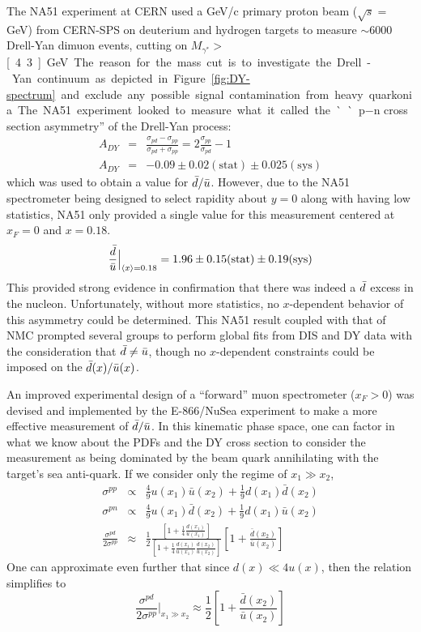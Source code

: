 The NA51 experiment at CERN\cite{Baldit:1994jk} used a \unit[450]{GeV/c} primary proton beam ($\sqrt{s}=$\unit[29]{GeV}) from CERN-SPS on deuterium and hydrogen targets to measure $\sim$6000 Drell-Yan dimuon events, cutting on $M_{\gamma^*}>$\unit[4.3]{GeV}. The reason for the mass cut is to investigate the Drell-Yan continuum as depicted in Figure~\ref{fig:DY-spectrum} and exclude any possible signal contamination from heavy quarkonia. The NA51 experiment looked to measure what it called the ``p$-$n cross section asymmetry'' of the Drell-Yan process:
\begin{eqnarray}
A_{DY} & = & \frac{\sigma_{pd}-\sigma_{pp}}{\sigma_{pd}+\sigma_{pp}} = 2\frac{\sigma_{pp}}{\sigma_{pd}} - 1 \\
A_{DY} & = &  -0.09 \pm 0.02 (\text{stat}) \pm 0.025 (\text{sys})
\end{eqnarray}
which was used to obtain a value for $\bar{d}/\bar{u}$. However, due to the NA51 spectrometer being designed to select rapidity about $y=0$ along with having low statistics, NA51 only provided a single value for this measurement centered at $x_F=0$ and $x=0.18$.
\begin{equation}
	\frac{\bar{d}}{\bar{u}} \Bigr|_{\langle x \rangle = 0.18} = 1.96 \pm 0.15\text{(stat)} \pm 0.19\text{(sys)}
\end{equation}
This provided strong evidence in confirmation that there was indeed a $\bar{d}$ excess in the nucleon. Unfortunately, without more statistics, no $x$-dependent behavior of this asymmetry could be determined. This NA51 result coupled with that of NMC prompted several groups to perform global fits from DIS and DY data with the consideration that $\bar{d}\neq\bar{u}$, though no $x$-dependent constraints could be imposed on the $\bar{d}(x)/\bar{u}(x)$.

An improved experimental design of a ``forward'' muon spectrometer ($x_F>0$) was devised and implemented by the E-866/NuSea experiment to make a more effective measurement of $\bar{d}/\bar{u}$. In this kinematic phase space, one can factor in what we know about the PDFs and the DY cross section to consider the measurement as being dominated by the beam quark annihilating with the target's sea anti-quark. If we consider only the regime of $x_1 \gg x_2$,
\begin{eqnarray}
\sigma^{pp} & \propto & \frac{4}{9} u(x_1)\bar{u}(x_2) + \frac{1}{9}d(x_1)\bar{d}(x_2) \\
\sigma^{pn} & \propto & \frac{4}{9} u(x_1)\bar{d}(x_2) + \frac{1}{9}d(x_1)\bar{u}(x_2) \\
\frac{\sigma^{pd}}{2\sigma^{pp}} & \approx & \frac{1}{2} \frac{\left[1 + \frac{1}{4} \frac{d(x_1)}{u(x_1)}\right]}{\left[1 + \frac{1}{4} \frac{d(x_1)}{u(x_1)}\frac{\bar{d}(x_2)}{\bar{u}(x_2)}\right]} \left[1 + \frac{\bar{d}(x_2)}{\bar{u}(x_2)}\right]
\end{eqnarray}
One can approximate even further that since $d(x) \ll 4 u(x)$, then the relation simplifies to
\begin{equation}
\frac{\sigma^{pd}}{2\sigma^{pp}}\Bigr|_{x_1\gg x_2} \approx
\frac{1}{2} \left[1 + \frac{\bar{d}(x_2)}{\bar{u}(x_2)}\right]
\label{eq:866-dbar-ubar}
\end{equation}

